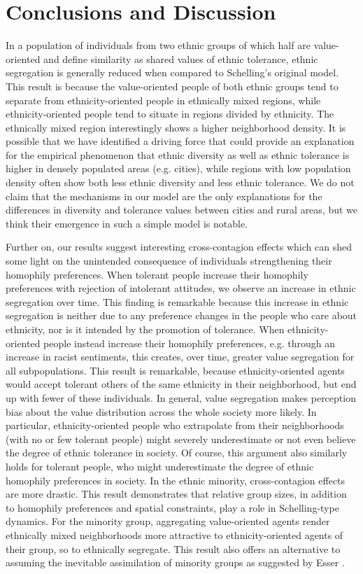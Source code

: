 \documentclass{ws-acs}
\begin{document}
{\section{Conclusions and Discussion}
In a population of individuals from two ethnic groups of which half are value-oriented and define similarity as shared values of ethnic tolerance, ethnic segregation is generally reduced when compared to Schelling's original model. This result  is because the value-oriented people of both ethnic groups tend to separate from ethnicity-oriented people in ethnically mixed regions, while ethnicity-oriented people tend to situate in regions divided by ethnicity. The ethnically mixed region interestingly shows a higher neighborhood density. It is possible that we have identified a driving force that could provide an explanation for the empirical phenomenon that ethnic diversity as well as ethnic tolerance is higher in densely populated areas (e.g. cities), while regions with low population density often show both less ethnic diversity and less ethnic tolerance. We do not claim that the mechanisms in our model are the only explanations for the differences in diversity and tolerance values between cities and rural areas, but we think their emergence in such a simple model is notable. 

Further on, our results suggest interesting cross-contagion effects which can shed some light on the unintended consequence of individuals strengthening their homophily preferences. 
When tolerant people increase their homophily preferences with rejection of intolerant attitudes, we observe an increase in ethnic segregation over time. This finding is remarkable because this increase in ethnic segregation is neither due to any preference changes in the people who care about ethnicity, nor is it intended by the promotion of tolerance.
When ethnicity-oriented people instead increase their homophily preferences, e.g. through an increase in racist sentiments, this creates, over time, greater value segregation for all subpopulations. This result is remarkable, because ethnicity-oriented agents would accept tolerant others of the same ethnicity in their neighborhood, but end up with fewer of these individuals. 
In general, value segregation makes perception bias about the value distribution across the whole society more likely. In particular, ethnicity-oriented people who extrapolate from their neighborhoods (with no or few tolerant people) might severely underestimate or not even believe the degree of ethnic tolerance in society. Of course, this argument  also similarly holds for tolerant people, who might underestimate the degree of ethnic homophily preferences in society. 
In the ethnic minority, cross-contagion effects are more drastic. This result demonstrates that relative group sizes, in addition to homophily preferences and spatial constraints, play a role in Schelling-type dynamics. For the minority group, aggregating value-oriented agents render ethnically mixed neighborhoods more attractive to ethnicity-oriented agents of their group, so to ethnically segregate. This result also offers an alternative to assuming the inevitable assimilation of minority groups as suggested by Esser \cite{Esser2010}.

}
\end{document}
